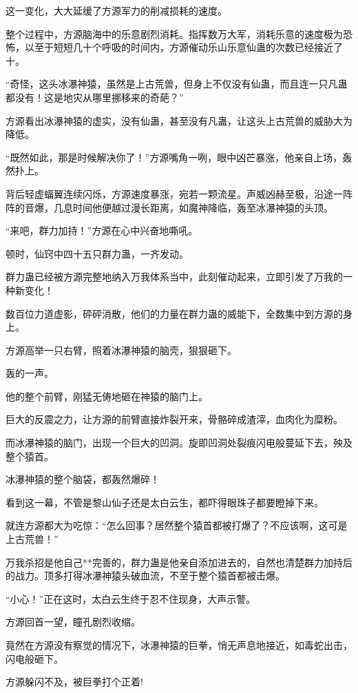 \begin{this_body}
这一变化，大大延缓了方源军力的削减损耗的速度。

整个过程中，方源脑海中的乐意剧烈消耗。指挥数万大军，消耗乐意的速度极为恐怖，以至于短短几十个呼吸的时间内，方源催动乐山乐意仙蛊的次数已经接近了十。

“奇怪，这头冰瀑神猿，虽然是上古荒兽，但身上不仅没有仙蛊，而且连一只凡蛊都没有！这是地灾从哪里挪移来的奇葩？”

方源看出冰瀑神猿的虚实，没有仙蛊，甚至没有凡蛊，让这头上古荒兽的威胁大为降低。

“既然如此，那是时候解决你了！”方源嘴角一咧，眼中凶芒暴涨，他亲自上场，轰然扑上。

背后轻虚蝠翼连续闪烁，方源速度暴涨，宛若一颗流星。声威凶赫至极，沿途一阵阵的音爆，几息时间他便越过漫长距离，如魔神降临，轰至冰瀑神猿的头顶。

“来吧，群力加持！”方源在心中兴奋地嘶吼。

顿时，仙窍中四十五只群力蛊，一齐发动。

群力蛊已经被方源完整地纳入万我体系当中，此刻催动起来，立即引发了万我的一种新变化！

数百位力道虚影，砰砰消散，他们的力量在群力蛊的威能下，全数集中到方源的身上。

方源高举一只右臂，照着冰瀑神猿的脑壳，狠狠砸下。

轰的一声。

他的整个前臂，刚猛无俦地砸在神猿的脑门上。

巨大的反震之力，让方源的前臂直接炸裂开来，骨骼碎成渣滓，血肉化为糜粉。

而冰瀑神猿的脑门，出现一个巨大的凹洞。旋即凹洞处裂痕闪电般蔓延下去，殃及整个猿首。

冰瀑神猿的整个脑袋，都轰然爆碎！

看到这一幕，不管是黎山仙子还是太白云生，都吓得眼珠子都要瞪掉下来。

就连方源都大为吃惊：“怎么回事？居然整个猿首都被打爆了？不应该啊，这可是上古荒兽！”

万我杀招是他自己**完善的，群力蛊是他亲自添加进去的，自然也清楚群力加持后的战力。顶多打得冰瀑神猿头破血流，不至于整个猿首都被击爆。

“小心！”正在这时，太白云生终于忍不住现身，大声示警。

方源回首一望，瞳孔剧烈收缩。

竟然在方源没有察觉的情况下，冰瀑神猿的巨拳，悄无声息地接近，如毒蛇出击，闪电般砸下。

方源躲闪不及，被巨拳打个正着!

\end{this_body}

